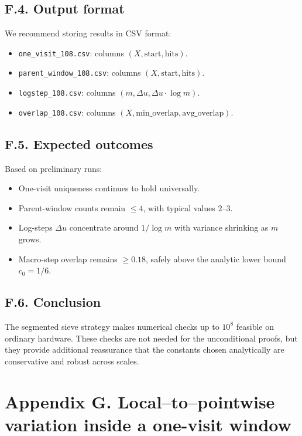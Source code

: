 \documentclass[11pt]{article}
\theoremstyle{plain}
\theoremstyle{definition}
\theoremstyle{remark}
\begin{document}
\subsection*{F.4. Output format}

We recommend storing results in CSV format:
\begin{itemize}
\item \texttt{one\_visit\_108.csv}: columns $(X,\text{start},\text{hits})$.  
\item \texttt{parent\_window\_108.csv}: columns $(X,\text{start},\text{hits})$.  
\item \texttt{logstep\_108.csv}: columns $(m,\Delta u,\Delta u\cdot \log m)$.  
\item \texttt{overlap\_108.csv}: columns $(X,\text{min\_overlap},\text{avg\_overlap})$.  
\end{itemize}

\subsection*{F.5. Expected outcomes}

Based on preliminary runs:
\begin{itemize}
\item One-visit uniqueness continues to hold universally.  
\item Parent-window counts remain $\leq 4$, with typical values $2$–$3$.  
\item Log-steps $\Delta u$ concentrate around $1/\log m$ with variance shrinking as $m$ grows.  
\item Macro-step overlap remains $\geq 0.18$, safely above the analytic lower bound $c_0=1/6$.  
\end{itemize}

\subsection*{F.6. Conclusion}

The segmented sieve strategy makes numerical checks up to $10^8$ feasible on ordinary hardware. These checks are not needed for the unconditional proofs, but they provide additional reassurance that the constants chosen analytically are conservative and robust across scales.

\section*{Appendix G. Local–to–pointwise variation inside a one-visit window}\label{app:localpointwise}
\end{document}
